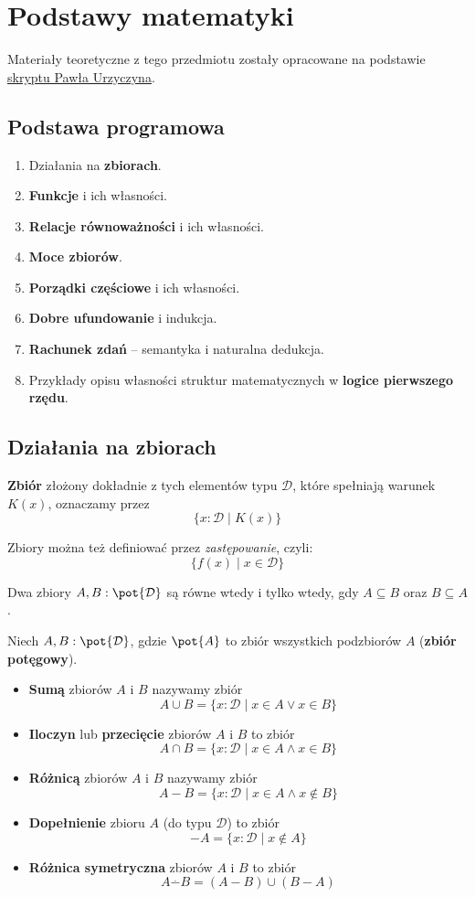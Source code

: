 \chapter{Podstawy matematyki}

Materiały teoretyczne z tego przedmiotu zostały opracowane na podstawie \href{https://www.mimuw.edu.pl/~urzy/Pmat/pomat.pdf}{skryptu Pawła Urzyczyna}.

\section*{Podstawa programowa}
\begin{enumerate}
    \item Działania na \textbf{zbiorach}.
    \item \textbf{Funkcje} i ich własności.
    \item \textbf{Relacje równoważności} i ich własności.
    \item \textbf{Moce zbiorów}.
    \item \textbf{Porządki częściowe} i ich własności.
    \item \textbf{Dobre ufundowanie} i indukcja.
    \item \textbf{Rachunek zdań} -- semantyka i naturalna dedukcja.
    \item Przykłady opisu własności struktur matematycznych w \textbf{logice pierwszego rzędu}.
\end{enumerate}

\section{Działania na zbiorach}

\textbf{Zbiór} złożony dokładnie z tych elementów typu $\mathcal{D}$, 
które spełniają warunek $K(x)$, oznaczamy przez $$\{x : \mathcal{D} \; | \; K(x) \}$$

Zbiory można też definiować przez \textit{zastępowanie}, czyli:
$$\{f(x) \; | \; x \in \mathcal{D} \}$$

Dwa zbiory $A, B : \pot{\mathcal{D}}$ są równe wtedy i tylko wtedy, gdy $A \subseteq B$ oraz $B \subseteq A$.

Niech $A, B : \pot{\mathcal{D}}$, gdzie $\pot{A}$ to zbiór wszystkich podzbiorów $A$ (\textbf{zbiór potęgowy}).
\begin{itemize}
    \item \textbf{Sumą} zbiorów $A$ i $B$ nazywamy zbiór
    $$A \cup B = \{ x : \mathcal{D} \; | \; x \in A 
    \lor x \in B \}$$
    \item \textbf{Iloczyn} lub \textbf{przecięcie} zbiorów $A$ i $B$ to zbiór
    $$A \cap B = \{ x : \mathcal{D} \; | \; x \in A \land x \in B \}$$
    \item \textbf{Różnicą} zbiorów $A$ i $B$ nazywamy zbiór
    $$A - B = \{ x : \mathcal{D} \; | \; x \in A \land x \notin B \}$$
    \item \textbf{Dopełnienie} zbioru $A$ (do typu $\mathcal{D}$)
    to zbiór $$-A = \{x : \mathcal{D} \; | \; x \notin A \}$$
    \item \textbf{Różnica symetryczna} zbiorów $A$ i $B$ to zbiór
    $$A \stackrel.- B = (A - B) \cup (B - A)$$
\end{itemize}

